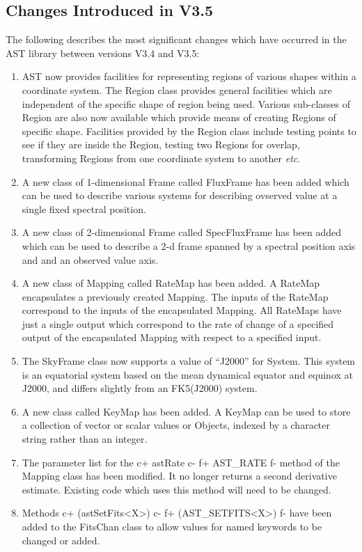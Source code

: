 \documentclass[twoside,11pt]{article}
\begin{document}
\subsection{Changes Introduced in V3.5}

The following describes the most significant changes which have
occurred in the AST library between versions V3.4 and V3.5:

\begin{enumerate}

\item AST now provides facilities for representing regions of various
shapes within a coordinate system. The Region class provides general
facilities which are independent of the specific shape of region being
used. Various sub-classes of Region are also now available which provide
means of creating Regions of specific shape. Facilities provided by the
Region class include testing points to see if they are inside the
Region, testing two Regions for overlap, transforming Regions from one
coordinate system to another \emph{etc}.

\item A new class of 1-dimensional Frame called FluxFrame has been added which
can be used to describe various systems for describing ovserved value at a
single fixed spectral position.

\item A new class of 2-dimensional Frame called SpecFluxFrame has been added which
can be used to describe a 2-d frame spanned by a spectral position axis
and and an observed value axis.

\item A new class of Mapping called RateMap has been added. A RateMap encapsulates
a previously created Mapping. The inputs of the RateMap correspond to the
inputs of the encapsulated Mapping. All RateMaps have just a single
output which correspond to the rate of change of a specified output of
the encapsulated Mapping with respect to a specified input.

\item The SkyFrame class now supports a value of ``J2000'' for System.
This system is an equatorial system based on the mean dynamical equator and
equinox at J2000, and differs slightly from an FK5(J2000) system.

\item A new class called KeyMap has been added. A KeyMap can be used to
store a collection of vector or scalar values or Objects, indexed by a
character string rather than an integer.

\item The parameter list for the
c+
astRate
c-
f+
AST\_RATE
f-
method of the Mapping class has been modified. It no longer returns a second
derivative estimate. Existing code which uses this method will need to be
changed.

\item Methods
c+
(astSetFits<X>)
c-
f+
(AST\_SETFITS<X>)
f-
have been added to the FitsChan class to allow values for named
keywords to be changed or added.

\end{enumerate}
\end{document}
